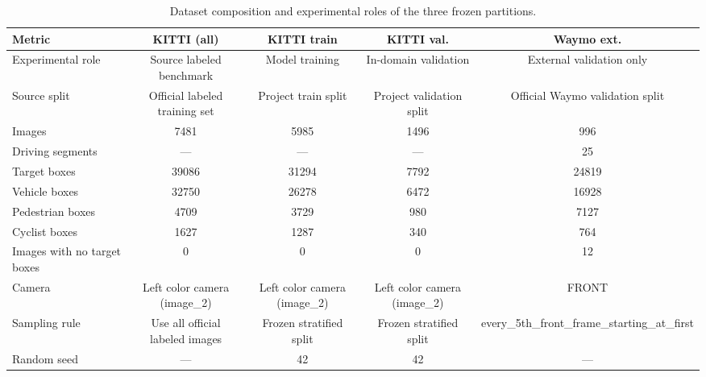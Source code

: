\begin{table}[t]
    \centering
    \caption{Dataset composition and experimental roles of the three frozen partitions.}
    \label{tab:dataset_comparison}
    \begin{tabular}{lcccc}
        \toprule
        Metric & KITTI (all) & KITTI train & KITTI val. & Waymo ext. \\
        \midrule
        Experimental role & Source labeled benchmark & Model training & In-domain validation & External validation only \\
        Source split & Official labeled training set & Project train split & Project validation split & Official Waymo validation split \\
        Images & 7481 & 5985 & 1496 & 996 \\
        Driving segments & --- & --- & --- & 25 \\
        Target boxes & 39086 & 31294 & 7792 & 24819 \\
        Vehicle boxes & 32750 & 26278 & 6472 & 16928 \\
        Pedestrian boxes & 4709 & 3729 & 980 & 7127 \\
        Cyclist boxes & 1627 & 1287 & 340 & 764 \\
        Images with no target boxes & 0 & 0 & 0 & 12 \\
        Camera & Left color camera (image\_2) & Left color camera (image\_2) & Left color camera (image\_2) & FRONT \\
        Sampling rule & Use all official labeled images & Frozen stratified split & Frozen stratified split & every\_5th\_front\_frame\_starting\_at\_first \\
        Random seed & --- & 42 & 42 & --- \\
        \bottomrule
    \end{tabular}
\end{table}
